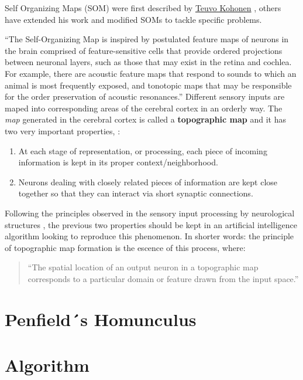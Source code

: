 \documentclass[]{book}
\providecommand{\tightlist}{%
  \setlength{\itemsep}{0pt}\setlength{\parskip}{0pt}}
\begin{document}
Self Organizing Maps (SOM) were first described by
\href{http://www.cis.hut.fi/research/som-research/teuvo.html}{Teuvo
Kohonen} \citep{kohonen1995self}, others have extended his work and
modified SOMs to tackle specific problems.

``The Self-Organizing Map is inspired by postulated feature maps of
neurons in the brain comprised of feature-sensitive cells that provide
ordered projections between neuronal layers, such as those that may
exist in the retina and cochlea. For example, there are acoustic feature
maps that respond to sounds to which an animal is most frequently
exposed, and tonotopic maps that may be responsible for the order
preservation of acoustic resonances.'' \citep{brownlee2011clever}
Different sensory inputs are maped into corresponding areas of the
cerebral cortex in an orderly way. The \emph{map} generated in the
cerebral cortex is called a \textbf{topographic map} and it has two very
important properties, \citep{somFundamentals}:

\begin{enumerate}
\def\labelenumi{\arabic{enumi}.}
\tightlist
\item
  At each stage of representation, or processing, each piece of incoming
  information is kept in its proper context/neighborhood.
\item
  Neurons dealing with closely related pieces of information are kept
  close together so that they can interact via short synaptic
  connections.
\end{enumerate}

Following the principles observed in the sensory input processing by
neurological structures , the previous two properties should be kept in
an artificial intelligence algorithm looking to reproduce this
phenomenon. In shorter words: the principle of topographic map formation
is the escence of this process, where:

\begin{quote}
``The spatial location of an output neuron in a topographic map
corresponds to a particular domain or feature drawn from the input
space.'' \citep{somFundamentals}
\end{quote}

\section{Penfield´s Homunculus}\label{penfields-homunculus}

\section{Algorithm}\label{algorithm}
\end{document}
